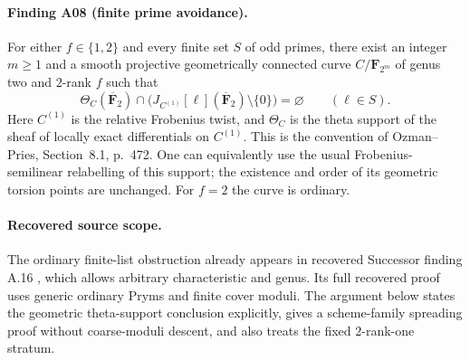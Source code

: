 \documentclass[11pt,a4paper]{article}
\begin{document}
\paragraph{Finding A08 (finite prime avoidance).}
For either $f\in\{1,2\}$ and every finite set $S$ of odd primes, there
exist an integer $m\ge1$ and a smooth projective geometrically connected
curve $C/\mathbf F_{2^m}$ of genus two and $2$-rank $f$ such that
\[
 \Theta_C(\overline{\mathbf F}_2)\cap
 \bigl(J_{C^{(1)}}[\ell](\overline{\mathbf F}_2)\setminus\{0\}\bigr)
 =\varnothing\qquad(\ell\in S).
 \tag{FP.1}
\]
Here $C^{(1)}$ is the relative Frobenius twist, and $\Theta_C$ is the
theta support of the sheaf of locally exact differentials on $C^{(1)}$.
This is the convention of Ozman--Pries, Section~8.1, p.~472.
One can equivalently use the usual Frobenius-semilinear relabelling of
this support; the existence and order of its geometric torsion points
are unchanged.  For $f=2$ the curve is ordinary.

\paragraph{Recovered source scope.}
The ordinary finite-list obstruction already appears in recovered
Successor finding A.16 \cite[A.16]{ASrun}, which allows arbitrary
characteristic and genus.  Its full recovered proof uses generic
ordinary Pryms and finite cover moduli.  The argument below states the
geometric theta-support conclusion explicitly, gives a scheme-family
spreading proof without coarse-moduli descent, and also treats the
fixed $2$-rank-one stratum.
\end{document}
